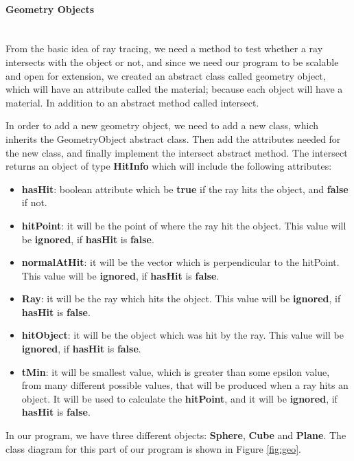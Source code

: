 \documentclass[a4paper]{article}
\newcommand{
	\subsubsubsection}[1]
{\paragraph{#1}\mbox{}\\[.35em]}
\begin{document}
	\subsubsubsection{Geometry Objects}
	\label{sssec:geo}From the basic idea of ray tracing, we need a method to test whether a ray intersects with the object or not, and since we need our program to be scalable and open for extension, we created an abstract class called geometry object, which will have an attribute called the material; because each object will have a material. In addition to an abstract method called intersect. \\
	\par In order to add a new geometry object, we need to add a new class, which inherits the GeometryObject abstract class. Then add the attributes needed for the new class, and finally implement the intersect abstract method. The intersect returns an object of type \textbf{HitInfo} which will include the following attributes:
	\begin{itemize}
		\item \textbf{hasHit}: boolean attribute which be \textbf{true} if the ray hits the object, and \textbf{false} if not.
		\item \textbf{hitPoint}: it will be the point of where the ray hit the object. This value will be \textbf{ignored}, if \textbf{hasHit} is \textbf{false}.
		\item \textbf{normalAtHit}: it will be the vector which is perpendicular to the hitPoint. This value will be \textbf{ignored}, if \textbf{hasHit} is \textbf{false}.
		\item \textbf{Ray}: it will be the ray which hits the object. This value will be \textbf{ignored}, if \textbf{hasHit} is \textbf{false}.
		\item \textbf{hitObject}: it will be the object which was hit by the ray. This value will be \textbf{ignored}, if \textbf{hasHit} is \textbf{false}.
		\item \textbf{tMin}: it will be smallest value, which is greater than some epsilon value, from many different possible values, that will be produced when a ray hits an object. It will be used to calculate the \textbf{hitPoint}, and it will be \textbf{ignored}, if \textbf{hasHit} is \textbf{false}.
	\end{itemize}
	\par In our program, we have three different objects: \textbf{Sphere}, \textbf{Cube} and \textbf{Plane}. The class diagram for this part of our program is shown in Figure \ref{fig:geo}.
\end{document}
